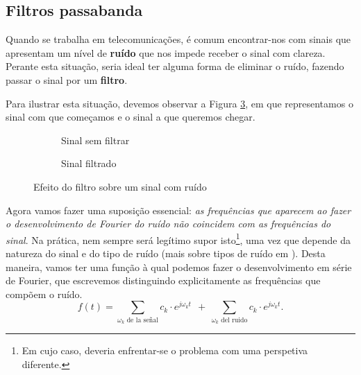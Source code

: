\subsection{Filtros passabanda}
Quando se trabalha em telecomunicações, é comum encontrar-nos com sinais que apresentam um nível de \textbf{ruído} que nos impede receber o sinal com clareza. Perante esta situação, seria ideal ter alguma forma de eliminar o ruído, fazendo passar o sinal por um \textbf{filtro}.

Para ilustrar esta situação, devemos observar a Figura \ref{fig:EfectoFiltro}, em que representamos o sinal com que começamos e o sinal a que queremos chegar.


\begin{figure}[h]
\begin{figurebox}
    \vspace{10pt}
    \centering
      \begin{subfigure}{.45\textwidth}
          \centering
          \scalebox{0.30}{ }
          \caption{Sinal sem filtrar}
          \label{fig:aa} 
      \end{subfigure}%
      \begin{subfigure}{.45\textwidth}
          \centering
          \scalebox{0.30}{}
          \caption{Sinal filtrado}
          \label{fig:bb}
      \end{subfigure}
      \caption{Efeito do filtro sobre um sinal com ruído}
      \label{fig:EfectoFiltro}
    
\end{figurebox}
\end{figure}

Agora vamos fazer uma suposição essencial: \textit{as frequências que aparecem ao fazer o desenvolvimento de Fourier do ruído não coincidem com as frequências do sinal}. Na prática, nem sempre será legítimo supor isto\footnote{ Em cujo caso, deveria enfrentar-se o problema com uma perspetiva diferente.}, uma vez que depende da natureza do sinal e do tipo de ruído (mais sobre tipos de ruído em \cite{ColorNoise}). Desta maneira, vamos ter uma função à qual podemos fazer o desenvolvimento em série de Fourier, que escrevemos distinguindo explicitamente as frequências que compõem o ruído.
\begin{equation}
  \label{eq:FourierSignalRuido1}
  f(t) = \sum_{\omega_k\text{ de la señal}}\!\!\!\!\!\!\!c_k \cdot e^{j\omega_k t}\ \ +\  \sum_{\omega_k\text{ del ruido}}\!\!\!\!\!c_k \cdot e^{j\omega_k t}.
\end{equation}

